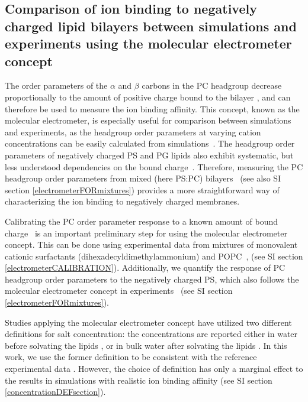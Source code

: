 \documentclass[aps,prl,superscriptaddress,twocolumn]{revtex4}
\begin{document}
\subsection{Comparison of ion binding to negatively charged lipid bilayers 
between simulations and experiments using the molecular electrometer concept}

The order parameters of the $\alpha$ and $\beta$ carbons in the PC headgroup
decrease proportionally to the amount of positive
charge bound to the bilayer \cite{akutsu81,altenbach84,seelig87},
and can therefore be used to measure the ion binding affinity.
This concept, known as the molecular electrometer, is especially useful for 
comparison between simulations and experiments, as
the headgroup order parameters at varying cation
concentrations can be easily calculated from
simulations~\cite{catte16}. The headgroup order parameters
of negatively charged PS and PG lipids also exhibit systematic, but less
understood dependencies on the bound charge~\cite{borle85,macdonald87,roux86,roux90}.
Therefore, measuring the PC headgroup order parameters from 
mixed (here PS:PC) bilayers~\cite{roux86,roux90,roux91} (see also SI section \ref{electrometerFORmixtures}) provides a more straightforward way of characterizing the ion binding to negatively charged membranes.

Calibrating the PC order parameter response to a known amount of bound charge~\cite{catte16,melcr18} is an important preliminary step for using the molecular electrometer concept.
This can be done using experimental data from mixtures of
monovalent cationic surfactants (dihexadecyldimethylammonium) and POPC~\cite{scherer89,melcr18},
(see SI section \ref{electrometerCALIBRATION}). Additionally, we quantify the response of PC headgroup order parameters
to the negatively charged PS, which also follows the molecular electrometer
concept in experiments~\cite{scherer87} (see SI section \ref{electrometerFORmixtures}).

Studies applying the molecular electrometer concept have utilized two different definitions for salt concentration:
the concentrations are reported either in water before solvating the lipids \cite{akutsu81,roux90,catte16},
or in bulk water after solvating the lipids \cite{altenbach84,melcr18}.
In this work, we use the former definition to be consistent with the reference
experimental data \cite{roux90}. However, the choice of definition has only a marginal effect
to the results in simulations with realistic ion binding affinity
(see SI section \ref{concentrationDEFsection}).
\end{document}
